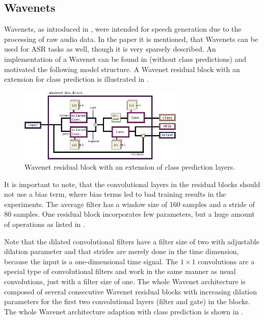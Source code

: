 \subsection{Wavenets}\label{sec:nn_arch_wavenet}
Wavenets, as introduced in \cite{Oord2016}, were intended for speech generation due to the processing of raw audio data.
In the paper it is mentioned, that Wavenets can be used for ASR tasks as well, though it is very sparsely described.
An implementation of a Wavenet can be found in \cite{Herrmann2018} (without class predictions) and motivated the following model structure.
A Wavenet residual block with an extension for class prediction is illustrated in .
\begin{figure}[!ht]
  \centering
    \includegraphics[width=0.7\textwidth]{./4_nn/figs/nn_arch_wavenet_block.pdf}
  \caption{Wavenet residual block \cite{Oord2016} with an extension of class prediction layers.}
  \label{fig:nn_arch_wavenet_block}
\end{figure}
\FloatBarrier
\noindent
It is important to note, that the convolutional layers in the residual blocks should not use a bias term, where bias terms led to bad training results in the experiments.
The average filter has a window size of 160 samples and a stride of 80 samples.
One residual block incorporates few parameters, but a huge amount of operations as listed in .

Note that the dilated convolutional filters have a filter size of two with adjustable dilation parameter and that strides are merely done in the time dimension, because the input is a one-dimensional time signal.
The $1 \times 1$ convolutions are a special type of convolutional filters and work in the same manner as usual convolutions, just with a filter size of one. 
The whole Wavenet architecture is composed of several consecutive Wavenet residual blocks with increasing dilation parameters for the first two convolutional layers (filter and gate) in the blocks.
The whole Wavenet architecture adaption with class prediction is shown in .
